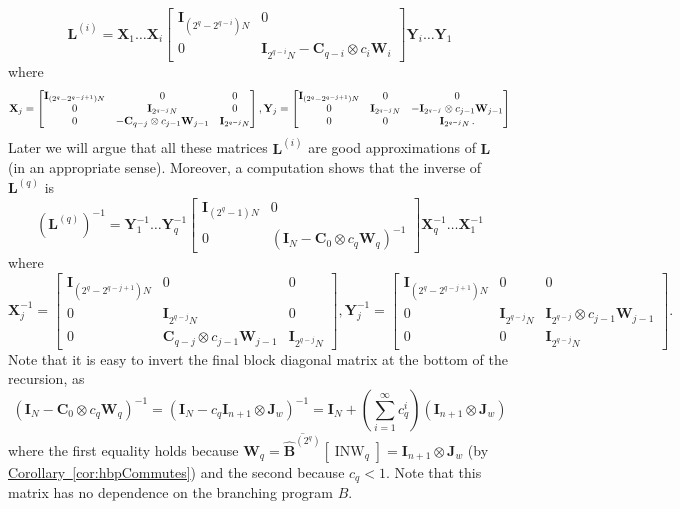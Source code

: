 \documentclass[11pt]{article}
\numberwithin{equation}{section}
\theoremstyle{definition}
\theoremstyle{plain}
\newcommand{\expref}[2]{\hyperref[#2]{#1~\ref{#2}}}
\newcommand{\mX}{\mathbf{X}}
\newcommand{\mY}{\mathbf{Y}}
\newcommand{\mC}{\mathbf{C}}
\newcommand{\mW}{\mathbf{W}}
\newcommand{\mL}{\mathbf{L}}
\newcommand{\I}{\mathbf{I}}
\newcommand{\Jw}{\mathbf{J}_w}
\newcommand{\Lq}{\mathbf{L}^{(q)}}
\DeclareMathOperator{\INW}{INW}
\newcommand{\hbbp}[2]{\overline{\mathbf{\hat{B}}^{(#1)}}\left[#2\right]}
\begin{document}
\begin{equation}
    \mL^{(i)}=\mX_1\dots \mX_i\begin{bmatrix}\I_{(2^q-2^{q-i})N} & 0\\ 0 & \I_{2^{q-i}N}-\mC_{q-i}\otimes c_i\mW_i\end{bmatrix}\mY_i\dots \mY_1 \label{eqn:Lq}%
\end{equation}
%
where %
\[\mX_j=\begin{bmatrix} \I_{(2^q-2^{q-j+1})N} & 0 & 0\\
0 & \I_{2^{q-j}N} & 0\\
0 & -\mC_{q-j}\otimes c_{j-1}\mW_{j-1} & \I_{2^{q-j}N}
\end{bmatrix},\\
\mY_j=\begin{bmatrix} \I_{(2^q-2^{q-j+1})N} & 0 & 0\\
0 & \I_{2^{q-j}N} & -\I_{2^{q-j}}\otimes c_{j-1}\mW_{j-1}\\
0 & 0 & \I_{2^{q-j}N}\,. %
\end{bmatrix}\]
Later we will argue that all these matrices $\mL^{(i)}$%
are good approximations of $\mL$ (in an appropriate sense). Moreover, 
a computation shows that the inverse of $\Lq$ is
%
\begin{equation}\label{eqn:Lqinv}
    (\Lq)^{-1} = \mY_1^{-1}\dots \mY_q^{-1}\begin{bmatrix}\I_{(2^q-1)N} & 0\\ 0 & (\I_{N}-\mC_{0}\otimes c_q \mW_q)^{-1}\end{bmatrix}\mX_q^{-1}\dots \mX_1^{-1}%
\end{equation}
%
where %
\[\mX_j^{-1}=\begin{bmatrix} \I_{(2^q-2^{q-j+1})N} & 0 & 0\\
0 & \I_{2^{q-j}N} & 0\\
0 & \mC_{q-j}\otimes c_{j-1}\mW_{j-1} & \I_{2^{q-j}N}
\end{bmatrix}, 
\mY_j^{-1}=\begin{bmatrix} \I_{(2^q-2^{q-j+1})N} & 0 & 0\\
0 & \I_{2^{q-j}N} & \I_{2^{q-j}}\otimes c_{j-1}\mW_{j-1}\\
0 & 0 & \I_{2^{q-j}N}
\end{bmatrix}.\]
Note that it is easy to invert the final block diagonal matrix at the bottom of the recursion, as
$$(\I_{N}-\mC_{0}\otimes c_q \mW_q)^{-1}=(\I_N-c_q\I_{n+1}\otimes \Jw)^{-1}=\I_N+\left(\sum_{i=1}^\infty c_q^i\right)(\I_{n+1}\otimes \Jw)$$ 
where the first equality holds because $\mW_q = \hbbp{2^q}{\INW_q}=\I_{n+1}\otimes\Jw$ (by \expref{Corollary}{cor:hbpCommutes}) and the second because $c_q<1$. Note that this matrix has no dependence on the branching program $B$.
\end{document}
